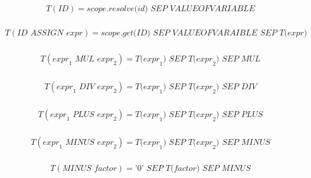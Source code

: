 \documentclass[a4paper,12pt]{article}
\begin{document}
\begin{landscape}
\begin{equation} 
\begin{aligned}
    T( \textit{ID})
    = \textit{scope.resolve(id) SEP VALUEOFVARIABLE}\\
\end{aligned}
\end{equation}

\begin{equation} 
\begin{aligned}
    T( \textit{ID ASSIGN expr})
    = \textit{scope.get(ID) SEP VALUEOFVARAIBLE SEP T(expr)}\\
\end{aligned}
\end{equation}

\begin{equation} 
\begin{aligned}
    T( \textit{expr}_{1} \textit{ MUL expr}_{2})
    = \textit{T(expr}_{1} \textit{) SEP T(expr}_{2} \textit{) SEP MUL}\\
\end{aligned}
\end{equation}

\begin{equation} 
\begin{aligned}
    T( \textit{expr}_{1} \textit{ DIV expr}_{2})
    = \textit{T(expr}_{1} \textit{) SEP T(expr}_{2} \textit{) SEP DIV}\\
\end{aligned}
\end{equation}

\begin{equation} 
\begin{aligned}
    T( \textit{expr}_{1} \textit{ PLUS expr}_{2})
    = \textit{T(expr}_{1} \textit{) SEP T(expr}_{2} \textit{) SEP PLUS}\\
\end{aligned}
\end{equation}

\begin{equation} 
\begin{aligned}
    T( \textit{expr}_{1} \textit{ MINUS expr}_{2})
    = \textit{T(expr}_{1} \textit{) SEP T(expr}_{2} \textit{) SEP MINUS}\\
\end{aligned}
\end{equation}

\begin{equation} 
\begin{aligned}
    T( \textit{MINUS factor}) = \textit{'0' SEP T(factor) SEP MINUS}\\
\end{aligned}
\end{equation}


\end{landscape}
\end{document}
